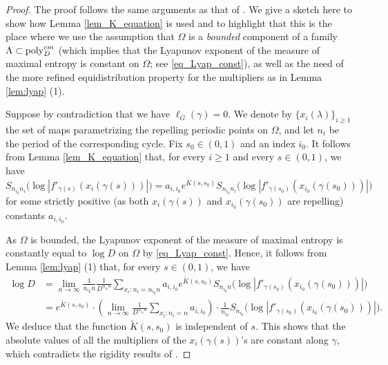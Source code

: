 \documentclass[11pt]{amsart}
\theoremstyle{plain}
\theoremstyle{definition}
\theoremstyle{remark}
\begin{document}
\begin{proof}
The proof follows the same arguments as that of \cite[Proposition 5.3]{BH24}.
We give a sketch here to show how Lemma \ref{lem_K_equation} is used and to highlight that this is the place where we use the assumption that $\Omega$ is a {\it bounded} component of a family $\Lambda\subset{\rm poly}_D^{cm}$
(which implies 
that the Lyapunov exponent of the measure of maximal entropy is constant on $\Omega$; see \eqref{eq_Lyap_const}),
as well as the need of the more refined equidistribution property for the multipliers as in Lemma \ref{lem:lyap} (1).

\medskip

Suppose by contradiction that we have
$\ell_G(\gamma)=0$. 
We denote by $\{x_i(\lambda)\}_{i\ge1}$ the set of maps parametrizing the repelling periodic points on $\Omega$, and let $n_i$ be the period
of the corresponding cycle.
Fix $s_0\in (0,1)$ and an index $i_0$.
It follows from Lemma \ref{lem_K_equation} that, for every $i\ge 1$
and every $s\in (0,1)$, we have
\begin{equation*}
S_{n_{i_0} n_i} \big(
\log |f'_{\gamma(s)} (x_i (\gamma(s)))|
\big)
= a_{i,i_0} e^{\widetilde K (s,s_0)} 
S_{n_{i_0} n_i}
\big(
\log |f'_{\gamma(s_0)} (x_{i_0} (\gamma(s_0)))|\big)
\end{equation*}
for some strictly
positive
(as both $x_i(\gamma(s))$ and $x_{i_0}(\gamma(s_0))$
are repelling)
constants $a_{i,i_0}$.

\medskip

As $\Omega$ is bounded, the Lyapunov exponent of the measure of maximal entropy is constantly
equal to $\log D$ on $\Omega$ by \eqref{eq_Lyap_const}.
Hence, it follows from Lemma \ref{lem:lyap} (1)
that,
 for every $s \in (0,1)$,
 we  have
\begin{equation} \label{eq_tildeL}
\begin{aligned}
\log D
& =
\lim_{n\to \infty}
\frac{1}{n_{i_0} n} \frac{1}{D^{n_{i_0}n}}
\sum_{x_i\colon n_i =n_{i_0}n}
 a_{i,i_0} e^{\widetilde K (s,s_0)} 
 S_{n_{i_0} n} \big(
 \log |f'_{\gamma(s_0)} (x_{i_0} (\gamma(s_0)))|\big) \nonumber\\
& = e^{\widetilde K (s,s_0)} \cdot
 \left(
 \lim_{n\to \infty}
 \frac{1}{D^{n_{i_0}n}}
 \sum_{x_i\colon n_i=n}
a_{i,i_0} 
\right)
\cdot
\frac{1}{n_{i_0}}
S_{n_{i_0}} \big(
\log |f'_{\gamma(s_0)} (x_{i_0} (\gamma(s_0)))|\big).
\end{aligned}
\end{equation}
We deduce that the function $\widetilde K(s,s_0)$ is independent of $s$.
This shows that the absolute values of all the multipliers
of the $x_i (\gamma(s))$'s are constant along $\gamma$, which contradicts the rigidity results of \cite{JiXie23}.
\end{proof}
\end{document}
